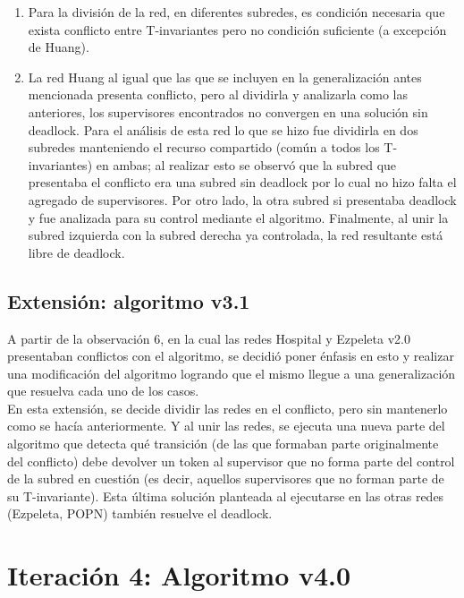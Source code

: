 \begin{enumerate}
    \item Para la división de la red, en diferentes subredes, es condición necesaria que exista conflicto entre T-invariantes pero no condición suficiente (a excepción de Huang).
    
    \item La red Huang al igual que las que se incluyen en la generalización antes mencionada presenta conflicto, pero al dividirla y analizarla como las anteriores, los supervisores encontrados no convergen en una solución sin deadlock. Para el análisis de esta red lo que se hizo fue dividirla en dos subredes manteniendo el recurso compartido (común a todos los T-invariantes) en ambas; al realizar esto se observó que la subred que presentaba el conflicto era una subred sin deadlock por lo cual no hizo falta el agregado de supervisores. Por otro lado, la otra subred si presentaba deadlock y fue analizada para su control mediante el algoritmo. Finalmente, al unir la subred izquierda con la subred derecha ya controlada, la red resultante está libre de deadlock.
\end{enumerate}

\subsection{Extensión: algoritmo v3.1}
A partir de la observación 6, en la cual las redes Hospital y Ezpeleta v2.0 presentaban conflictos con el algoritmo, se decidió poner énfasis en esto y realizar una modificación del algoritmo logrando que el mismo llegue a una generalización que resuelva cada uno de los casos.\\
En esta extensión, se decide dividir las redes en el conflicto, pero sin mantenerlo como se hacía anteriormente. Y al unir las redes, se ejecuta una nueva parte del algoritmo que detecta qué transición (de las que formaban parte originalmente del conflicto) debe devolver un token al supervisor que no forma parte del control de la subred en cuestión (es decir, aquellos supervisores que no forman parte de su T-invariante). Esta última solución planteada al ejecutarse en las otras redes (Ezpeleta, POPN) también resuelve el deadlock.\\
\bigskip

\section{Iteración 4: Algoritmo v4.0} \label{sec:algoritmo4}


